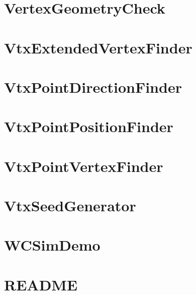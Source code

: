 \documentclass[twoside]{book}
\begin{document}
\chapter{Vertex\-Geometry\-Check}
\label{md_UserTools_VertexGeometryCheck_README}
\hypertarget{md_UserTools_VertexGeometryCheck_README}{}

\chapter{Vtx\-Extended\-Vertex\-Finder}
\label{md_UserTools_VtxExtendedVertexFinder_README}
\hypertarget{md_UserTools_VtxExtendedVertexFinder_README}{}

\chapter{Vtx\-Point\-Direction\-Finder}
\label{md_UserTools_VtxPointDirectionFinder_README}
\hypertarget{md_UserTools_VtxPointDirectionFinder_README}{}

\chapter{Vtx\-Point\-Position\-Finder}
\label{md_UserTools_VtxPointPositionFinder_README}
\hypertarget{md_UserTools_VtxPointPositionFinder_README}{}

\chapter{Vtx\-Point\-Vertex\-Finder}
\label{md_UserTools_VtxPointVertexFinder_README}
\hypertarget{md_UserTools_VtxPointVertexFinder_README}{}

\chapter{Vtx\-Seed\-Generator}
\label{md_UserTools_VtxSeedGenerator_README}
\hypertarget{md_UserTools_VtxSeedGenerator_README}{}

\chapter{W\-C\-Sim\-Demo}
\label{md_UserTools_WCSimDemo_README}
\hypertarget{md_UserTools_WCSimDemo_README}{}

\chapter{R\-E\-A\-D\-M\-E}
\label{md_DataModel_README}
\hypertarget{md_DataModel_README}{}

\end{document}

